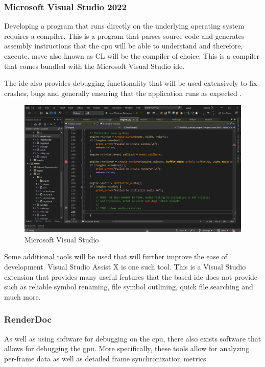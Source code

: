 \documentclass[11pt]{article}
\begin{document}
\subsubsection{Microsoft Visual Studio 2022}
Developing a program that runs directly on the underlying operating system
requires a compiler. This is a program that parses source code and generates
assembly instructions that the \gls{cpu} will be able to understand and
therefore, execute. \gls{msvc} also known as CL will be the compiler of choice.
This is a compiler that comes bundled with the Microsoft Visual Studio
\gls{ide}.

The \gls{ide} also provides debugging functionality that will be used
extensively to fix crashes, bugs and generally ensuring that the application
runs as expected \cite{visualstudio}. 

\begin{figure}[h!]
  \centering
  \includegraphics[width=\textwidth]{images/visual_studio.png}
  \caption{Microsoft Visual Studio}
  \label{fig:visual_studio}
\end{figure}

Some additional tools will be used that will further improve the ease of
development.  Visual Studio Assist X \cite{visualstudioassistx} is one such
tool. This is a Visual Studio extension that provides many useful features that
the based \gls{ide} does not provide such as reliable symbol renaming, file symbol
outlining, quick file searching and much more.


\subsubsection{RenderDoc}
As well as using software for debugging on the \gls{cpu}, there also exists
software that allows for debugging the \gls{gpu}. More specifically, these tools
allow for analyzing per-frame data as well as detailed frame synchronization
metrics.
\end{document}
